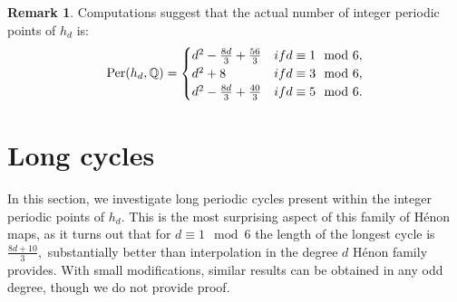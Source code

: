 \documentclass[12pt]{amsart}
\theoremstyle{definition}
\newtheorem*{remark}{Remark}
\begin{document}
\begin{remark}
    Computations suggest that the actual number of integer periodic points of $h_d$ is:
    \begin{equation*}
        \text{Per}(h_d,\mathbb{Q})
        = 
        \begin{cases}
            d^2 -\frac{8d}{3}+\frac{56}{3} & \textnormal{if }d\equiv 1 \mod 6 ,\\
            d^2 + 8 & \textnormal{if }d\equiv 3 \mod 6 ,\\
            d^2 -\frac{8d}{3}+\frac{40}{3} & \textnormal{if }d\equiv 5 \mod 6.
        \end{cases}
    \end{equation*}
\end{remark}




\section{Long cycles}

In this section, we investigate long periodic cycles present within the integer periodic points of $h_d$. This is the most surprising aspect of this family of H\'enon maps, as it turns out that for $d\equiv 1\mod 6$ the length of the longest cycle is $\frac{8d+10}{3},$ substantially better than interpolation in the degree $d$ H\'enon family provides. With small modifications, similar results can be obtained in any odd degree, though we do not provide proof.
\end{document}

